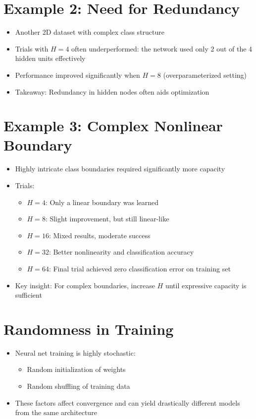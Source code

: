 \documentclass[11pt]{article}
\begin{document}
\section{Example 2: Need for Redundancy}

\begin{itemize}
    \item Another 2D dataset with complex class structure
    \item Trials with $H = 4$ often underperformed: the network used only 2 out of the 4 hidden units effectively
    \item Performance improved significantly when $H = 8$ (overparameterized setting)
    \item Takeaway: Redundancy in hidden nodes often aids optimization
\end{itemize}

\section{Example 3: Complex Nonlinear Boundary}

\begin{itemize}
    \item Highly intricate class boundaries required significantly more capacity
    \item Trials:
    \begin{itemize}
        \item $H = 4$: Only a linear boundary was learned
        \item $H = 8$: Slight improvement, but still linear-like
        \item $H = 16$: Mixed results, moderate success
        \item $H = 32$: Better nonlinearity and classification accuracy
        \item $H = 64$: Final trial achieved zero classification error on training set
    \end{itemize}
    \item Key insight: For complex boundaries, increase $H$ until expressive capacity is sufficient
\end{itemize}

\section{Randomness in Training}

\begin{itemize}
    \item Neural net training is highly stochastic:
    \begin{itemize}
        \item Random initialization of weights
        \item Random shuffling of training data
    \end{itemize}
    \item These factors affect convergence and can yield drastically different models from the same architecture
\end{itemize}
\end{document}
